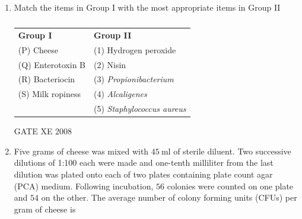 \documentclass[12pt]{article}
\begin{document}
\begin{enumerate}[label=Q\arabic*.]
\item Match the items in Group I with the most appropriate items in Group II
 
\begin{table}[H]     \centering     \caption{}     \label{}     \begin{tabular}{l l}

\textbf{Group I} & \textbf{Group II} \\
(P) Cheese & (1) Hydrogen peroxide \\
(Q) Enterotoxin B & (2) Nisin \\
(R) Bacteriocin & (3) \textit{Propionibacterium} \\
(S) Milk ropiness & (4) \textit{Alcaligenes} \\
 & (5) \textit{Staphylococcus aureus} \\
\end{tabular} \end{table}  

\begin{enumerate}[label=(\Alph*)]
\end{enumerate}

GATE XE 2008

\item Five grams of cheese was mixed with $45\ \mathrm{ml}$ of sterile diluent. Two successive dilutions of 1:100 each were made and one-tenth milliliter from the last dilution was plated onto each of two plates containing plate count agar (PCA) medium. Following incubation, $56$ colonies were counted on one plate and $54$ on the other. The average number of colony forming units (CFUs) per gram of cheese is

\begin{enumerate}[label=(\Alph*)]
\end{enumerate}


\end{enumerate}
\end{document}
